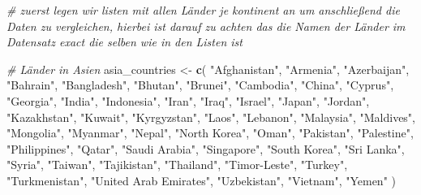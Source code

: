 \documentclass[
]{article}
\newenvironment{Shaded}{\begin{snugshade}}{\end{snugshade}}
\newcommand{\CommentTok}[1]{\textcolor[rgb]{0.56,0.35,0.01}{\textit{#1}}}
\newcommand{\FunctionTok}[1]{\textcolor[rgb]{0.13,0.29,0.53}{\textbf{#1}}}
\newcommand{\NormalTok}[1]{#1}
\newcommand{\OtherTok}[1]{\textcolor[rgb]{0.56,0.35,0.01}{#1}}
\newcommand{\StringTok}[1]{\textcolor[rgb]{0.31,0.60,0.02}{#1}}
\begin{document}
\begin{Shaded}
\begin{Highlighting}[]
\CommentTok{\# zuerst legen wir listen mit allen Länder je kontinent an um anschließend die Daten zu vergleichen, hierbei ist darauf zu achten das die Namen der Länder im Datensatz exact die selben wie in den Listen ist}

\CommentTok{\# Länder in Asien}
\NormalTok{asia\_countries }\OtherTok{\textless{}{-}} \FunctionTok{c}\NormalTok{(}
  \StringTok{"Afghanistan"}\NormalTok{, }\StringTok{"Armenia"}\NormalTok{, }\StringTok{"Azerbaijan"}\NormalTok{, }\StringTok{"Bahrain"}\NormalTok{, }\StringTok{"Bangladesh"}\NormalTok{, }\StringTok{"Bhutan"}\NormalTok{, }
  \StringTok{"Brunei"}\NormalTok{, }\StringTok{"Cambodia"}\NormalTok{, }\StringTok{"China"}\NormalTok{, }\StringTok{"Cyprus"}\NormalTok{, }\StringTok{"Georgia"}\NormalTok{, }\StringTok{"India"}\NormalTok{, }\StringTok{"Indonesia"}\NormalTok{, }
  \StringTok{"Iran"}\NormalTok{, }\StringTok{"Iraq"}\NormalTok{, }\StringTok{"Israel"}\NormalTok{, }\StringTok{"Japan"}\NormalTok{, }\StringTok{"Jordan"}\NormalTok{, }\StringTok{"Kazakhstan"}\NormalTok{, }\StringTok{"Kuwait"}\NormalTok{, }
  \StringTok{"Kyrgyzstan"}\NormalTok{, }\StringTok{"Laos"}\NormalTok{, }\StringTok{"Lebanon"}\NormalTok{, }\StringTok{"Malaysia"}\NormalTok{, }\StringTok{"Maldives"}\NormalTok{, }\StringTok{"Mongolia"}\NormalTok{, }
  \StringTok{"Myanmar"}\NormalTok{, }\StringTok{"Nepal"}\NormalTok{, }\StringTok{"North Korea"}\NormalTok{, }\StringTok{"Oman"}\NormalTok{, }\StringTok{"Pakistan"}\NormalTok{, }\StringTok{"Palestine"}\NormalTok{, }
  \StringTok{"Philippines"}\NormalTok{, }\StringTok{"Qatar"}\NormalTok{, }\StringTok{"Saudi Arabia"}\NormalTok{, }\StringTok{"Singapore"}\NormalTok{, }\StringTok{"South Korea"}\NormalTok{, }
  \StringTok{"Sri Lanka"}\NormalTok{, }\StringTok{"Syria"}\NormalTok{, }\StringTok{"Taiwan"}\NormalTok{, }\StringTok{"Tajikistan"}\NormalTok{, }\StringTok{"Thailand"}\NormalTok{, }\StringTok{"Timor{-}Leste"}\NormalTok{, }
  \StringTok{"Turkey"}\NormalTok{, }\StringTok{"Turkmenistan"}\NormalTok{, }\StringTok{"United Arab Emirates"}\NormalTok{, }\StringTok{"Uzbekistan"}\NormalTok{, }
  \StringTok{"Vietnam"}\NormalTok{, }\StringTok{"Yemen"}
\NormalTok{)}


\end{Highlighting}
\end{Shaded}
\end{document}
